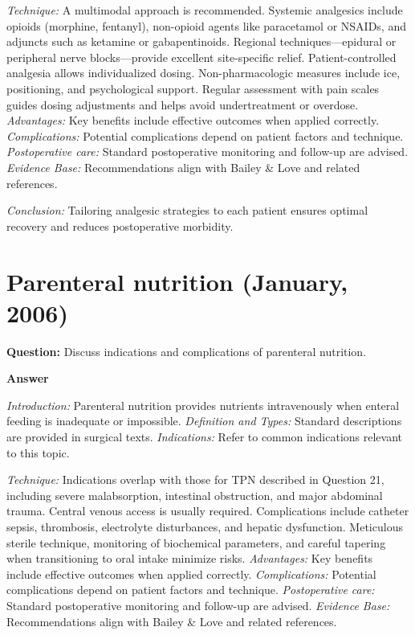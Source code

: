 \documentclass{article}
\begin{document}
\emph{Technique:} A multimodal approach is recommended. Systemic analgesics include opioids (morphine, fentanyl), non-opioid agents like paracetamol or NSAIDs, and adjuncts such as ketamine or gabapentinoids. Regional techniques—epidural or peripheral nerve blocks—provide excellent site-specific relief. Patient-controlled analgesia allows individualized dosing. Non-pharmacologic measures include ice, positioning, and psychological support. Regular assessment with pain scales guides dosing adjustments and helps avoid undertreatment or overdose.
\emph{Advantages:} Key benefits include effective outcomes when applied correctly.
\emph{Complications:} Potential complications depend on patient factors and technique.
\emph{Postoperative care:} Standard postoperative monitoring and follow-up are advised.
\emph{Evidence Base:} Recommendations align with Bailey \& Love and related references.

\emph{Conclusion:} Tailoring analgesic strategies to each patient ensures optimal recovery and reduces postoperative morbidity.


\section{Parenteral nutrition (January, 2006)}

\textbf{Question:} Discuss indications and complications of parenteral nutrition.

\textbf{Answer}

\emph{Introduction:} Parenteral nutrition provides nutrients intravenously when enteral feeding is inadequate or impossible.
\emph{Definition and Types:} Standard descriptions are provided in surgical texts.
\emph{Indications:} Refer to common indications relevant to this topic.

\emph{Technique:} Indications overlap with those for TPN described in Question 21, including severe malabsorption, intestinal obstruction, and major abdominal trauma. Central venous access is usually required. Complications include catheter sepsis, thrombosis, electrolyte disturbances, and hepatic dysfunction. Meticulous sterile technique, monitoring of biochemical parameters, and careful tapering when transitioning to oral intake minimize risks.
\emph{Advantages:} Key benefits include effective outcomes when applied correctly.
\emph{Complications:} Potential complications depend on patient factors and technique.
\emph{Postoperative care:} Standard postoperative monitoring and follow-up are advised.
\emph{Evidence Base:} Recommendations align with Bailey \& Love and related references.
\end{document}
